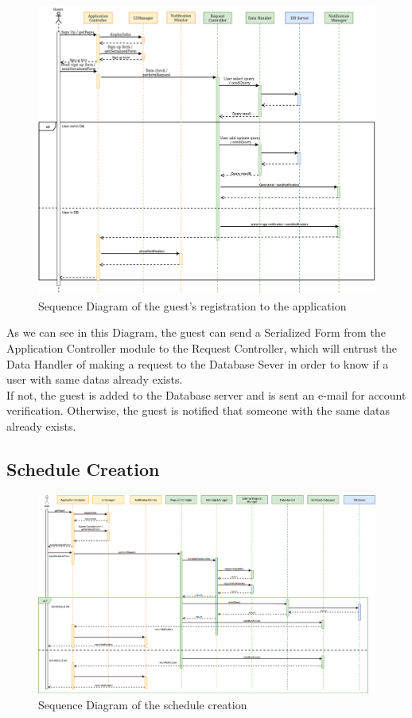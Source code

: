 \documentclass[numbers=noenddot, 12pt, a4paper, oneside]{scrbook}
\begin{document}
\begin{figure}[H]
	\centering
	\includegraphics[width=1.1\textwidth,angle=-0]{images/Goal1}
	\caption{Sequence Diagram of the guest's registration to the application}
\end{figure}

As we can see in this Diagram, the guest can send a Serialized Form from the Application Controller module to the Request Controller, which will entrust the Data Handler of making a request to the Database Sever in order to know if a user with same datas already exists.\\

If not, the guest is added to the Database server and is sent an e-mail for account verification. Otherwise, the guest is notified that someone with the same datas already exists.

\subsection*{Schedule Creation}

\begin{figure}[H]
	\centering
	\includegraphics[width=1.1\textwidth,angle=-0]{images/Goal2}
	\caption{Sequence Diagram of the schedule creation}
\end{figure}
\end{document}
